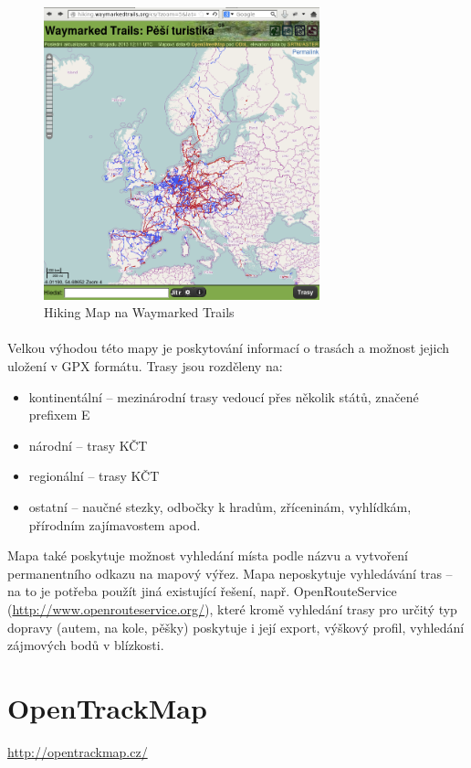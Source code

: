 \documentclass[11pt,a4paper,titlepage,oneside]{book}
\begin{document}
		\begin{figure}[!h]
			\begin{center}
				\includegraphics[width=8cm]{obrazky/waymarkedTrails.png}
				\caption{Hiking Map na Waymarked Trails}
			\end{center}
		\end{figure}
	
		\paragraph{} Velkou výhodou této mapy je poskytování informací o trasách a možnost jejich uložení v GPX formátu. Trasy jsou rozděleny na:
	\begin{itemize}
		 \item kontinentální -- mezinárodní trasy vedoucí přes několik států, značené prefixem E
		 \item národní -- trasy KČT
		 \item regionální -- trasy KČT
     		 \item ostatní -- naučné stezky, odbočky k hradům, zříceninám, vyhlídkám, přírodním zajímavostem apod.
	\end{itemize}
  Mapa také poskytuje možnost vyhledání místa podle názvu a vytvoření permanentního odkazu na mapový výřez. Mapa neposkytuje vyhledávání tras -- na to je potřeba použít jiná existující řešení, např. OpenRouteService (\url{http://www.openrouteservice.org/}), které kromě vyhledání trasy pro určitý typ dopravy (autem, na kole, pěšky) poskytuje i její export, výškový profil, vyhledání zájmových bodů v blízkosti.

 	\section{OpenTrackMap}
		\url{http://opentrackmap.cz/}
\end{document}
